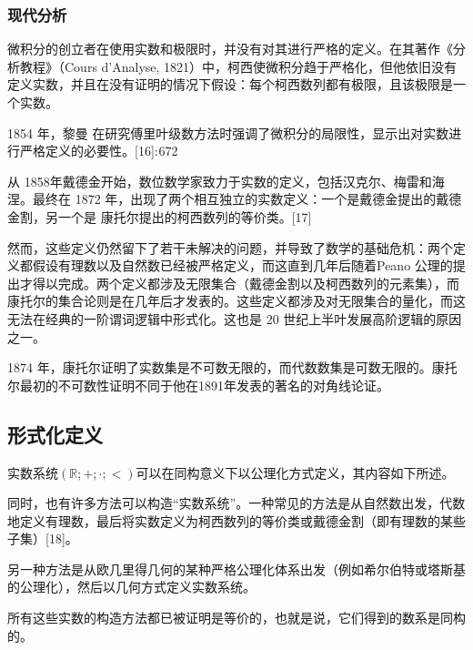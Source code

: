 \subsubsection{现代分析}
微积分的创立者在使用实数和极限时，并没有对其进行严格的定义。在其著作《分析教程》（Cours d'Analyse, 1821）中，柯西使微积分趋于严格化，但他依旧没有定义实数，并且在没有证明的情况下假设：每个柯西数列都有极限，且该极限是一个实数。

1854 年，黎曼 在研究傅里叶级数方法时强调了微积分的局限性，显示出对实数进行严格定义的必要性。[16]: 672 

从 1858年戴德金开始，数位数学家致力于实数的定义，包括汉克尔、梅雷和海涅。最终在 1872 年，出现了两个相互独立的实数定义：一个是戴德金提出的戴德金割，另一个是 康托尔提出的柯西数列的等价类。[17]

然而，这些定义仍然留下了若干未解决的问题，并导致了数学的基础危机：两个定义都假设有理数以及自然数已经被严格定义，而这直到几年后随着Peano 公理的提出才得以完成。两个定义都涉及无限集合（戴德金割以及柯西数列的元素集），而康托尔的集合论则是在几年后才发表的。这些定义都涉及对无限集合的量化，而这无法在经典的一阶谓词逻辑中形式化。这也是 20 世纪上半叶发展高阶逻辑的原因之一。

1874 年，康托尔证明了实数集是不可数无限的，而代数数集是可数无限的。康托尔最初的不可数性证明不同于他在1891年发表的著名的对角线论证。
\subsection{形式化定义}
实数系统$(\mathbb{R}; +; \cdot; <)$可以在同构意义下以公理化方式定义，其内容如下所述。

同时，也有许多方法可以构造“实数系统”。一种常见的方法是从自然数出发，代数地定义有理数，最后将实数定义为柯西数列的等价类或戴德金割（即有理数的某些子集）[18]。

另一种方法是从欧几里得几何的某种严格公理化体系出发（例如希尔伯特或塔斯基的公理化），然后以几何方式定义实数系统。

所有这些实数的构造方法都已被证明是等价的，也就是说，它们得到的数系是同构的。
